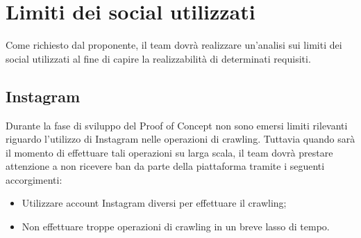 \section{Limiti dei social utilizzati}
Come richiesto dal proponente, il team dovrà realizzare un'analisi sui limiti dei social utilizzati al fine di capire la realizzabilità di determinati requisiti.

\subsection{Instagram}
Durante la fase di sviluppo del Proof of Concept non sono emersi limiti rilevanti riguardo l'utilizzo di Instagram nelle operazioni di crawling. Tuttavia quando sarà il momento di effettuare tali operazioni su larga scala, il team dovrà prestare attenzione a non ricevere ban da parte della piattaforma tramite i seguenti accorgimenti:
\begin{itemize}
    \item Utilizzare account Instagram diversi per effettuare il crawling;
    \item Non effettuare troppe operazioni di crawling in un breve lasso di tempo.
\end{itemize}

